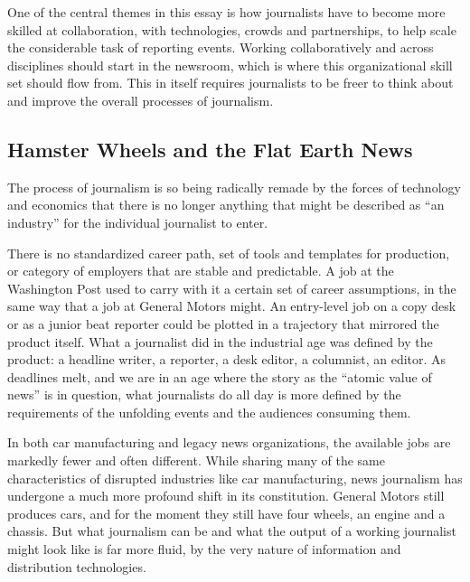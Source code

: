 One of the central themes in this essay is how journalists have to become more
skilled at collaboration, with technologies, crowds and partnerships, to help scale
the considerable task of reporting events. Working collaboratively and across disciplines
should start in the newsroom, which is where this organizational skill set
should flow from. This in itself requires journalists to be freer to think about and
improve the overall processes of journalism.

\subsection{Hamster Wheels and the Flat Earth News}

The process of journalism is so being radically remade by the forces of technology
and economics that there is no longer anything that might be described as
``an industry'' for the individual journalist to enter.

There is no standardized career path, set of tools and templates for production,
or category of employers that are stable and predictable. A job at the Washington
Post used to carry with it a certain set of career assumptions, in the same way that
a job at General Motors might. An entry-level job on a copy desk or as a junior
beat reporter could be plotted in a trajectory that mirrored the product itself.
What a journalist did in the industrial age was defined by the product: a headline
writer, a reporter, a desk editor, a columnist, an editor. As deadlines melt, and we
are in an age where the story as the ``atomic value of news'' is in question, what
journalists do all day is more defined by the requirements of the unfolding events
and the audiences consuming them.

In both car manufacturing and legacy news organizations, the available jobs are
markedly fewer and often different. While sharing many of the same characteristics
of disrupted industries like car manufacturing, news journalism has undergone a
much more profound shift in its constitution. General Motors still produces cars,
and for the moment they still have four wheels, an engine and a chassis. But what
journalism can be and what the output of a working journalist might look like is
far more fluid, by the very nature of information and distribution technologies.

